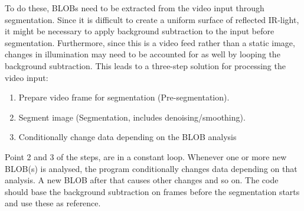 To do these, BLOBs need to be extracted from the video input through segmentation. Since it is difficult to create a uniform surface of reflected IR-light, it might be necessary to apply background subtraction to the input before segmentation. Furthermore, since this is a video feed rather than a static image, changes in illumination may need to be accounted for as well by looping the background subtraction. This leads to a three-step solution for processing the video input:
\begin{enumerate}
\item Prepare video frame for segmentation (Pre-segmentation).
\item Segment image (Segmentation, includes denoising/smoothing).
\item Conditionally change data depending on the BLOB analysis
\end{enumerate}
Point 2 and 3 of the steps, are in a constant loop. Whenever one or more new BLOB(s) is analysed, the program conditionally changes data depending on that analysis. A new BLOB after that causes other changes and so on. The code should base the background subtraction on frames before the segmentation starts and use these as reference.

